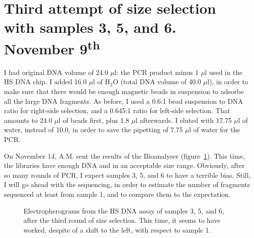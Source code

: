 \documentclass[a4paper,12pt]{article}
\begin{document}
\section{Third attempt of size selection with samples 3, 5, and 6. November 9\textsuperscript{th}}
I had original DNA volume of 24.0 $\mu$l: the PCR product minus 1 $\mu$l used in the HS DNA chip. I added 16.0 $\mu$l of H$_2$O (total DNA volume of 40.0 $\mu$l), in order to make sure that there would be enough magnetic beads in suspension to adsorbe all the large DNA fragments. As before, I used a 0.6:1 bead suspension to DNA ratio for right-side selection, and a 0.645:1 ratio for left-side selection. That amounts to 24.0 $\mu$l of beads first, plus 1.8 $\mu$l afterwards. I eluted with 17.75 $\mu$l of water, instead of 10.0, in order to save the pipetting of 7.75 $\mu$l of water for the PCR.

On November 14, A.M. sent the results of the Bioanalyser (figure~\ref{fig:sizeselection3}). This time, the libraries have enough DNA and in an acceptable size range. Obviously, after so many rounds of PCR, I expect samples 3, 5, and 6 to have a terrible bias. Still, I will go ahead with the sequencing, in order to estimate the number of fragments sequenced at least from sample 1, and to compare them to the expectation.

\begin{figure}
\caption{Electropherograms from the HS DNA assay of samples 3, 5, and 6, after the third round of size selection. This time, it seems to have worked, despite of a shift to the left, with respect to sample 1.}\label{fig:sizeselection3}
\end{figure}
\end{document}
